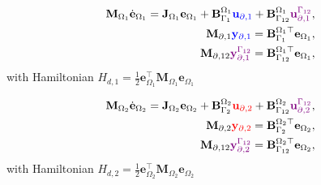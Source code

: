 \begin{tcbraster}[raster columns=2, raster equal height]
	\begin{tcolorbox}[width=0.48\textwidth, nobeforeafter, colframe=cyan,title=System \eqref{eq:pHlinsys_findim_Om1},  coltitle=black]%
	\begin{equation}\label{eq:pHfindim_Om1}
	\begin{aligned}
	\mathbf{M}_{\Omega_1}
	\dot{\mathbf{e}}_{\Omega_1}
	= \mathbf{J}_{\Omega_1} {\mathbf{e}}_{\Omega_1} + 
	\mathbf{B}_{\Gamma_1}^{\Omega_1} \textcolor{blue}{\mathbf{u}_{\partial, 1}} + \mathbf{B}_{\Gamma_{12}}^{\Omega_1}
	\textcolor{violet}{\mathbf{u}_{\partial, 1}^{\Gamma_{12}}}, \\
	\mathbf{M}_{\partial, 1} \textcolor{blue}{\mathbf{y}_{\partial, 1}} = \mathbf{B}_{\Gamma_1}^{\Omega_1 \top} \mathbf{e}_{\Omega_1}, \\
	\mathbf{M}_{\partial, 12} \textcolor{violet}{\mathbf{y}_{\partial, 1}^{\Gamma_{12}}} = \mathbf{B}_{\Gamma_{12}}^{\Omega_1 \top} \mathbf{e}_{\Omega_1},
	\end{aligned}
	\end{equation}
	with Hamiltonian $H_{d, 1} = \frac{1}{2} {\mathbf{e}}_{\Omega_1}^\top \mathbf{M}_{\Omega_1}
	{\mathbf{e}}_{\Omega_1}$
	\end{tcolorbox} 
	\begin{tcolorbox}[width=0.48\textwidth, nobeforeafter,  colframe=lightyellow,title=System \eqref{eq:pHlinsys_findim_Om2}, coltitle=black]%
	\begin{equation}\label{eq:pHfindim_Om2}
	\begin{aligned}
	\mathbf{M}_{\Omega_2}
	\dot{\mathbf{e}}_{\Omega_2}
	= \mathbf{J}_{\Omega_2} {\mathbf{e}}_{\Omega_2} + 
	\mathbf{B}_{\Gamma_2}^{\Omega_2} \textcolor{red}{\mathbf{u}_{\partial, 2}} + \mathbf{B}_{\Gamma_{12}}^{\Omega_2}
	\textcolor{violet}{\mathbf{u}_{\partial, 2}^{\Gamma_{12}}}, \\
	\mathbf{M}_{\partial, 2} \textcolor{red}{\mathbf{y}_{\partial, 2}} = \mathbf{B}_{\Gamma_2}^{\Omega_2 \top} \mathbf{e}_{\Omega_2}, \\
	\mathbf{M}_{\partial, 12} \textcolor{violet}{\mathbf{y}_{\partial, 2}^{\Gamma_{12}}} = \mathbf{B}_{\Gamma_{12}}^{\Omega_2 \top} \mathbf{e}_{\Omega_2},
	\end{aligned}
	\end{equation}
	with Hamiltonian $H_{d, 2} = \frac{1}{2} {\mathbf{e}}_{\Omega_2}^\top \mathbf{M}_{\Omega_2}
	{\mathbf{e}}_{\Omega_2}$
	\end{tcolorbox}
\end{tcbraster}


